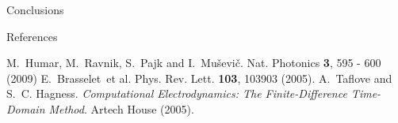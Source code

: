 \documentclass[8pt]{beamer}
\newcommand{\blockpadding}{
  \rule[-0.6ex]{0pt}{2.5ex}
}
\begin{document}
\begin{columns}[t]
\begin{column}{0.596\textwidth}
\begin{block}{\blockpadding Conclusions}
\end{block}


 \begin{block}{\blockpadding References}
  \begin{thebibliography}{6}
M.~Humar, M.~Ravnik, S.~Pajk and I.~Mu\v sevi\v c. Nat. Photonics {\bf 3}, 595 - 600 (2009) 
E.~Brasselet~et al. Phys. Rev. Lett. {\bf 103}, 103903 (2005).
A.~Taflove and S.~C. Hagness. {\em Computational Electrodynamics: The Finite-Difference Time-Domain Method}. Artech House (2005).
\end{thebibliography}

 \end{block}

 \end{column}

\end{columns}
\end{document}
